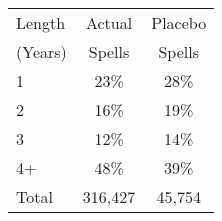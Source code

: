 \begin{tabular}{lcc}
\toprule
Length & Actual & Placebo \\
(Years) & Spells & Spells \\
\midrule
1 & 23\% & 28\% \\
2 & 16\% & 19\% \\
3 & 12\% & 14\% \\
4+ & 48\% & 39\% \\
Total &      316,427 &       45,754 \\
\bottomrule
\end{tabular}
